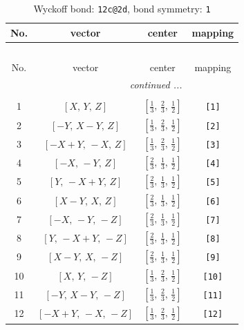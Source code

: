 \documentclass[fleqn,8pt]{jsarticle}
\begin{document}
\renewcommand{\arraystretch}{1.2}
\begin{longtable}{cccc}
\caption{Wyckoff bond: {\tt 12c@2d}, bond symmetry: {\tt 1}}
 \\
 \hline \hline
No. & vector & center & mapping \\ \hline \endfirsthead

\multicolumn{3}{l}{\tablename\ \thetable{}} \\
 \hline \hline
No. & vector & center & mapping \\ \hline \endhead

 \hline \hline
\multicolumn{3}{r}{\footnotesize\it continued ...} \\ \endfoot

 \hline \hline
\multicolumn{3}{r}{} \\ \endlastfoot

1 & $\left[ X,\, Y,\, Z \right]$ & $\left[ \frac{1}{3},\, \frac{2}{3},\, \frac{1}{2} \right]$ & {\tt [1]} \\ \hline
2 & $\left[ - Y,\, X - Y,\, Z \right]$ & $\left[ \frac{1}{3},\, \frac{2}{3},\, \frac{1}{2} \right]$ & {\tt [2]} \\ \hline
3 & $\left[ - X + Y,\, - X,\, Z \right]$ & $\left[ \frac{1}{3},\, \frac{2}{3},\, \frac{1}{2} \right]$ & {\tt [3]} \\ \hline
4 & $\left[ - X,\, - Y,\, Z \right]$ & $\left[ \frac{2}{3},\, \frac{1}{3},\, \frac{1}{2} \right]$ & {\tt [4]} \\ \hline
5 & $\left[ Y,\, - X + Y,\, Z \right]$ & $\left[ \frac{2}{3},\, \frac{1}{3},\, \frac{1}{2} \right]$ & {\tt [5]} \\ \hline
6 & $\left[ X - Y,\, X,\, Z \right]$ & $\left[ \frac{2}{3},\, \frac{1}{3},\, \frac{1}{2} \right]$ & {\tt [6]} \\ \hline
7 & $\left[ - X,\, - Y,\, - Z \right]$ & $\left[ \frac{2}{3},\, \frac{1}{3},\, \frac{1}{2} \right]$ & {\tt [7]} \\ \hline
8 & $\left[ Y,\, - X + Y,\, - Z \right]$ & $\left[ \frac{2}{3},\, \frac{1}{3},\, \frac{1}{2} \right]$ & {\tt [8]} \\ \hline
9 & $\left[ X - Y,\, X,\, - Z \right]$ & $\left[ \frac{2}{3},\, \frac{1}{3},\, \frac{1}{2} \right]$ & {\tt [9]} \\ \hline
10 & $\left[ X,\, Y,\, - Z \right]$ & $\left[ \frac{1}{3},\, \frac{2}{3},\, \frac{1}{2} \right]$ & {\tt [10]} \\ \hline
11 & $\left[ - Y,\, X - Y,\, - Z \right]$ & $\left[ \frac{1}{3},\, \frac{2}{3},\, \frac{1}{2} \right]$ & {\tt [11]} \\ \hline
12 & $\left[ - X + Y,\, - X,\, - Z \right]$ & $\left[ \frac{1}{3},\, \frac{2}{3},\, \frac{1}{2} \right]$ & {\tt [12]} \\
\end{longtable}
\end{document}
